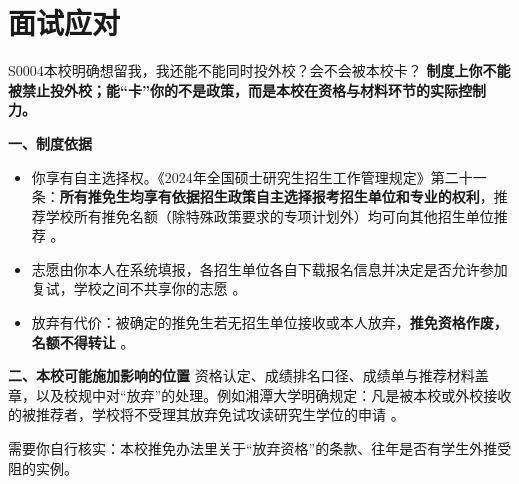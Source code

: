 \section{面试应对}
\begin{qa}{S0004}{本校明确想留我，我还能不能同时投外校？会不会被本校卡？}
\textbf{制度上你不能被禁止投外校；能“卡”你的不是政策，而是本校在资格与材料环节的实际控制力。}

\textbf{一、制度依据}
\begin{itemize}
  \item 你享有自主选择权。《2024年全国硕士研究生招生工作管理规定》第二十一条：\textbf{所有推免生均享有依据招生政策自主选择报考招生单位和专业的权利}，推荐学校所有推免名额（除特殊政策要求的专项计划外）均可向其他招生单位推荐 。
  \item 志愿由你本人在系统填报，各招生单位各自下载报名信息并决定是否允许参加复试，学校之间不共享你的志愿 。
  \item 放弃有代价：被确定的推免生若无招生单位接收或本人放弃，\textbf{推免资格作废，名额不得转让} 。
\end{itemize}

\textbf{二、本校可能施加影响的位置}
资格认定、成绩排名口径、成绩单与推荐材料盖章，以及校规中对“放弃”的处理。例如湘潭大学明确规定：凡是被本校或外校接收的被推荐者，学校将不受理其放弃免试攻读研究生学位的申请 。

需要你自行核实：本校推免办法里关于“放弃资格”的条款、往年是否有学生外推受阻的实例。
\end{qa}

